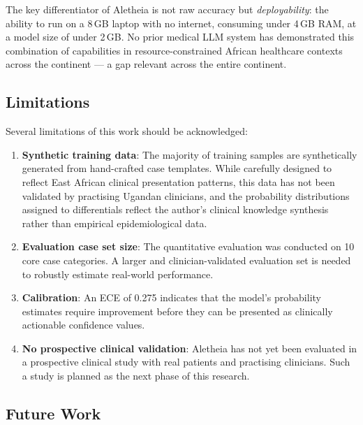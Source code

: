 \documentclass[journal]{IEEEtran}
\begin{document}
The key differentiator of Aletheia is not raw accuracy but
\textit{deployability}: the ability to run on a 8\,GB laptop
with no internet, consuming under 4\,GB RAM, at a model size of
under 2\,GB. No prior medical LLM system has demonstrated this
combination of capabilities in resource-constrained African healthcare contexts
across the continent --- a gap relevant across the entire continent.

\subsection{Limitations}

Several limitations of this work should be acknowledged:

\begin{enumerate}
  \item \textbf{Synthetic training data}: The majority of training
        samples are synthetically generated from hand-crafted case
        templates. While carefully designed to reflect East African
        clinical presentation patterns, this data has not been
        validated by practising Ugandan clinicians, and the
        probability distributions assigned to differentials reflect
        the author's clinical knowledge synthesis rather than
        empirical epidemiological data.

  \item \textbf{Evaluation case set size}: The quantitative
        evaluation was conducted on 10 core case categories. A
        larger and clinician-validated evaluation set is needed to
        robustly estimate real-world performance.

  \item \textbf{Calibration}: An ECE of 0.275 indicates that the
        model's probability estimates require improvement before
        they can be presented as clinically actionable confidence
        values.

  \item \textbf{No prospective clinical validation}: Aletheia has
        not yet been evaluated in a prospective clinical study with
        real patients and practising clinicians. Such a study is
        planned as the next phase of this research.
\end{enumerate}

\subsection{Future Work}
\end{document}
